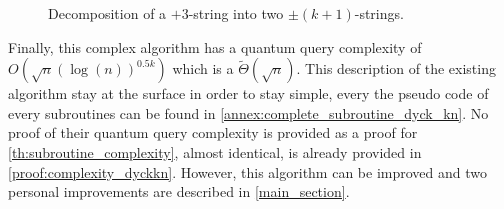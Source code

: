\begin{itemize}
\begin{figure}[h!]
              \caption{Decomposition of a $+3$-string into two $\pm(k+1)$-strings.}
              \label{fig:dyck_hered}
          \end{figure}
\end{itemize}

Finally, this complex algorithm has a quantum query
complexity of $O\left(\sqrt{n}(\log(n))^{0.5k}\right)$ which is a
$\tilde{\Theta}\left(\sqrt{n}\right)$. This description of the existing
algorithm stay at the surface in order to stay simple, every the pseudo
code of every subroutines can be found in
\autoref{annex:complete_subroutine_dyck_kn}. No proof of their
quantum query complexity is provided as a proof for
\autoref{th:subroutine_complexity}, almost identical,
is already provided in \autoref{proof:complexity_dyckkn}.
However, this algorithm can
be improved and two personal improvements are described in \autoref{main_section}.
